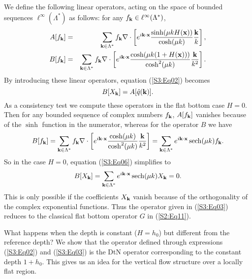 We define the following linear operators, acting on the space of bounded sequences $\ell^{\infty}(\Lambda^*)$ as follows: for any $f_{\bold{k}}\in\ell^{\infty}(\Lambda^*)$, 
\begin{eqnarray} 
A[f_{\bold{k}}] &=& \sum_{\bold{k}\in\Lambda^*} f_{\bold{k}}\nabla \cdot \left[ e^{i\bold{k}\cdot\bold{x}} \frac{\sinh(\mu k H(\bold{x}))}{\cosh(\mu k)}\frac{\bold{k}}{k}\right], \label{S3:Eq04}\\ 
B[f_{\bold{k}}] &=& \sum_{\bold{k}\in\Lambda^*} f_{\bold{k}}\nabla\cdot \left[ e^{i\bold{k}\cdot\bold{x}} \frac{\cosh(\mu k(1+H(\bold{x})))}{\cosh^2(\mu k)}\frac{\bold{k}}{k^2}\right].\label{S3:Eq05}
\end{eqnarray}
By introducing these linear operators, equation (\ref{S3:Eq02}) becomes
\begin{equation}\label{S3:Eq06}
B[X_{\bold{k}}]=A[\hat{q}(\bold{k})].
\end{equation}
As a consistency test we compute these operators in the flat bottom case $H = 0$. 
Then  for any bounded sequence of complex numbers $f_{\bold{k}}$, $A[f_{\bold{k}}]$ vanishes because of the $\sinh$ function in the numerator, whereas for the operator $B$ we have 
\begin{equation}
B[f_{\bold{k}}] = \sum_{\bold{k}\in\Lambda^*} f_{\bold{k}}\nabla\cdot \left[ e^{i\bold{k}\cdot\bold{x}} \frac{\cosh(\mu k)}{\cosh^2(\mu k)}\frac{\bold{k}}{k^2}\right] = \sum_{\bold{k}\in\Lambda^*}e^{i\bold{k}\cdot\bold{x}}\operatorname{sech}(\mu k)f_{\bold{k}}.
\end{equation}
So in the case $H=0$, equation (\ref{S3:Eq06}) simplifies to
\begin{equation}
B[X_{\bold{k}}] = \sum_{\bold{k}\in\Lambda^*}e^{i\bold{k}\cdot\bold{x}}\operatorname{sech}(\mu k)X_{\bold{k}} = 0.
\end{equation}
This is only possible if the coefficients $X_{\bold{k}}$ vanish because of the orthogonality of the complex exponential functions. Thus the operator given in (\ref{S3:Eq03}) reduces to the classical flat bottom operator $G$ in (\ref{S2:Eq11}).
\begin{comment}
\begin{equation}
G[q] = \phi_z(\x,0) = \sum_{\ka\in\Lambda^*}e^{i\ka\cdot\x}\hat{q}(\ka)\mu k\tanh(\mu k).
\end{equation}
\end{comment}

What happens when the depth is constant ($H=h_0$) but different from the reference depth? 
We show that the operator defined through expressions (\ref{S3:Eq02}) and (\ref{S3:Eq03}) is the DtN 
operator corresponding to the constant depth $1+h_0$. This gives us an idea for the vertical flow structure over
a locally flat region.


